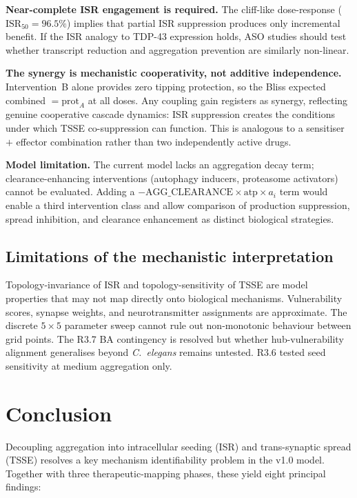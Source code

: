 \documentclass[12pt,a4paper]{article}
\begin{document}
\textbf{Near-complete ISR engagement is required.} The cliff-like dose-response ($\mathrm{ISR}_{50}
= 96.5\%$) implies that partial ISR suppression produces only incremental benefit. If the ISR
analogy to TDP-43 expression holds, ASO studies should test whether transcript
reduction and aggregation prevention are similarly non-linear.

\textbf{The synergy is mechanistic cooperativity, not additive independence.} Intervention~B
alone provides zero tipping protection, so the Bliss expected combined $= \text{prot}_A$ at
all doses. Any coupling gain registers as synergy, reflecting genuine cooperative cascade
dynamics: ISR suppression creates the conditions under which TSSE co-suppression can function.
This is analogous to a sensitiser $+$ effector combination rather than two independently active
drugs.

\textbf{Model limitation.} The current model lacks an aggregation decay term; clearance-enhancing
interventions (autophagy inducers, proteasome activators) cannot be evaluated. Adding a
$-\mathrm{AGG\_CLEARANCE} \times \mathrm{atp} \times a_i$ term would enable a third
intervention class and allow comparison of production suppression, spread inhibition, and
clearance enhancement as distinct biological strategies.

\subsection{Limitations of the mechanistic interpretation}

Topology-invariance of ISR and topology-sensitivity of TSSE are model properties that may not
map directly onto biological mechanisms. Vulnerability scores, synapse weights, and
neurotransmitter assignments are approximate. The discrete $5{\times}5$ parameter sweep cannot
rule out non-monotonic behaviour between grid points. The R3.7 BA contingency is resolved but
whether hub-vulnerability alignment generalises beyond \textit{C.~elegans} remains untested.
R3.6 tested seed sensitivity at medium aggregation only.

\section{Conclusion}

Decoupling aggregation into intracellular seeding (ISR) and trans-synaptic spread (TSSE)
resolves a key mechanism identifiability problem in the v1.0 model. Together with three
therapeutic-mapping phases, these yield eight principal findings:
\end{document}
